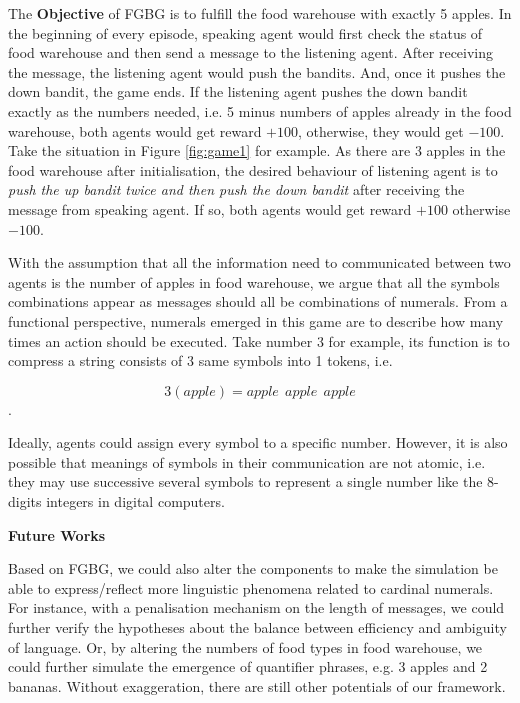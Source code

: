 \documentclass[a4paper,11pt]{article}
\begin{document}
The \textbf{Objective} of FGBG is to fulfill the food warehouse with exactly 5 apples. In the beginning of every episode, speaking agent would first check the status of food warehouse and then send a message to the listening agent. After receiving the message, the listening agent would push the bandits. And, once it pushes the down bandit, the game ends. If the listening agent pushes the down bandit exactly as the numbers needed, i.e. 5 minus numbers of apples already in the food warehouse, both agents would get reward $+100$, otherwise, they would get $-100$. Take the situation in Figure \ref{fig:game1} for example. As there are 3 apples in the food warehouse after initialisation, the desired behaviour of listening agent is to \textit{push the up bandit twice and then push the down bandit} after receiving the message from speaking agent. If so, both agents would get reward $+100$ otherwise $-100$.

With the assumption that all the information need to communicated between two agents is the number of apples in food warehouse, we argue that all the symbols combinations appear as messages should all be combinations of numerals. From a functional perspective, numerals emerged in this game are to describe how many times an action should be executed. Take number $3$ for example, its function is to compress a string consists of 3 same symbols into 1 tokens, i.e.

$$3(apple) = apple \ \ apple\ \ apple$$ .

Ideally, agents could assign every symbol to a specific number. However, it is also possible that meanings of symbols in their communication are not atomic, i.e. they may use successive several symbols to represent a single number like the 8-digits integers in digital computers.

\noindent\textbf{Future Works}

Based on FGBG, we could also alter the components to make the simulation be able to express/reflect more linguistic phenomena related to cardinal numerals. For instance, with a penalisation mechanism on the length of messages, we could further verify the hypotheses about the balance between efficiency and ambiguity of language. Or, by altering the numbers of food types in food warehouse, we could further simulate the emergence of quantifier phrases, e.g. 3 apples and 2 bananas. Without exaggeration, there are still other potentials of our framework.

\label{ssec:3.4garmmar_game}
\end{document}
